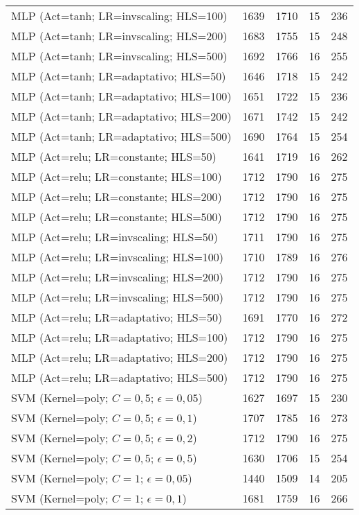 \begin{center}
\begin{longtable}{|l|l|l|l|l|}
MLP (Act=tanh; LR=invscaling; HLS=100) & 1639 & 1710 & 15 & 236 \\
MLP (Act=tanh; LR=invscaling; HLS=200) & 1683 & 1755 & 15 & 248 \\
MLP (Act=tanh; LR=invscaling; HLS=500) & 1692 & 1766 & 16 & 255 \\
MLP (Act=tanh; LR=adaptativo; HLS=50) & 1646 & 1718 & 15 & 242 \\
MLP (Act=tanh; LR=adaptativo; HLS=100) & 1651 & 1722 & 15 & 236 \\
MLP (Act=tanh; LR=adaptativo; HLS=200) & 1671 & 1742 & 15 & 242 \\
MLP (Act=tanh; LR=adaptativo; HLS=500) & 1690 & 1764 & 15 & 254 \\
MLP (Act=relu; LR=constante; HLS=50) & 1641 & 1719 & 16 & 262 \\
MLP (Act=relu; LR=constante; HLS=100) & 1712 & 1790 & 16 & 275 \\
MLP (Act=relu; LR=constante; HLS=200) & 1712 & 1790 & 16 & 275 \\
MLP (Act=relu; LR=constante; HLS=500) & 1712 & 1790 & 16 & 275 \\
MLP (Act=relu; LR=invscaling; HLS=50) & 1711 & 1790 & 16 & 275 \\
MLP (Act=relu; LR=invscaling; HLS=100) & 1710 & 1789 & 16 & 276 \\
MLP (Act=relu; LR=invscaling; HLS=200) & 1712 & 1790 & 16 & 275 \\
MLP (Act=relu; LR=invscaling; HLS=500) & 1712 & 1790 & 16 & 275 \\
MLP (Act=relu; LR=adaptativo; HLS=50) & 1691 & 1770 & 16 & 272 \\
MLP (Act=relu; LR=adaptativo; HLS=100) & 1712 & 1790 & 16 & 275 \\
MLP (Act=relu; LR=adaptativo; HLS=200) & 1712 & 1790 & 16 & 275 \\
MLP (Act=relu; LR=adaptativo; HLS=500) & 1712 & 1790 & 16 & 275 \\
SVM (Kernel=poly; $C=0,5$; $\epsilon=0,05$) & 1627 & 1697 & 15 & 230 \\
SVM (Kernel=poly; $C=0,5$; $\epsilon=0,1$) & 1707 & 1785 & 16 & 273 \\
SVM (Kernel=poly; $C=0,5$; $\epsilon=0,2$) & 1712 & 1790 & 16 & 275 \\
SVM (Kernel=poly; $C=0,5$; $\epsilon=0,5$) & 1630 & 1706 & 15 & 254 \\
SVM (Kernel=poly; $C=1$; $\epsilon=0,05$) & 1440 & 1509 & 14 & 205 \\
SVM (Kernel=poly; $C=1$; $\epsilon=0,1$) & 1681 & 1759 & 16 & 266 \\

\end{longtable}
\end{center}
